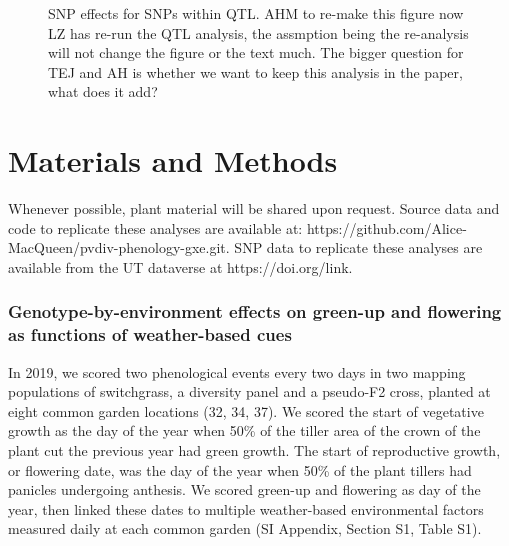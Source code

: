 \documentclass[
  9pt,
  twocolumn,
  twoside]{pnas-new}
\begin{document}
\begin{figure}


\caption{\label{fig-qtl}SNP effects for SNPs within QTL. AHM to re-make
this figure now LZ has re-run the QTL analysis, the assmption being the
re-analysis will not change the figure or the text much. The bigger
question for TEJ and AH is whether we want to keep this analysis in the
paper, what does it add?}

\end{figure}%

\section{Materials and Methods}\label{materials-and-methods}

Whenever possible, plant material will be shared upon request. Source
data and code to replicate these analyses are available at:
https://github.com/Alice-MacQueen/pvdiv-phenology-gxe.git. SNP data to
replicate these analyses are available from the UT dataverse at
https://doi.org/link.

\subsubsection{Genotype-by-environment effects on green-up and flowering
as functions of weather-based
cues}\label{genotype-by-environment-effects-on-green-up-and-flowering-as-functions-of-weather-based-cues}

In 2019, we scored two phenological events every two days in two mapping
populations of switchgrass, a diversity panel and a pseudo-F2 cross,
planted at eight common garden locations (32, 34, 37). We scored the
start of vegetative growth as the day of the year when 50\% of the
tiller area of the crown of the plant cut the previous year had green
growth. The start of reproductive growth, or flowering date, was the day
of the year when 50\% of the plant tillers had panicles undergoing
anthesis. We scored green-up and flowering as day of the year, then
linked these dates to multiple weather-based environmental factors
measured daily at each common garden (SI Appendix, Section S1, Table
S1).
\end{document}
